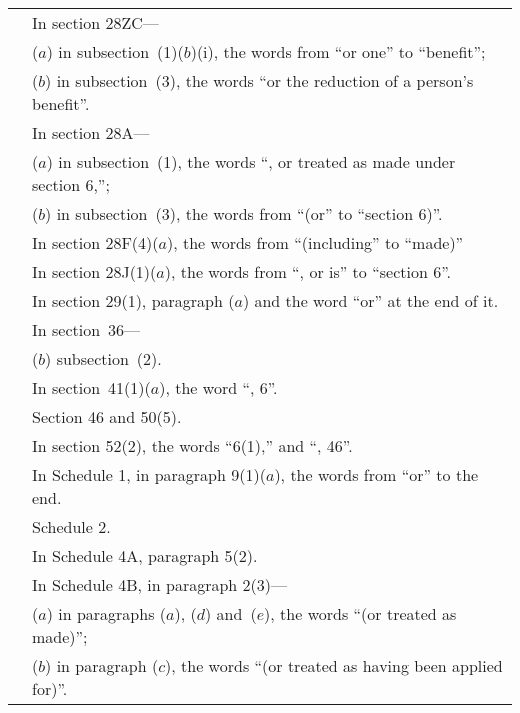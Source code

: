 \documentclass[12pt,a4paper]{article}
\begin{document}
\begin{longtable}{p{137.53691pt}p{228.4536pt}}
&In section 28ZC—\\
&\hspace*{1em}($a$) in subsection~(1)($b$)(i), the words from “or \hspace*{1em}one” to “benefit”;\\
&\hspace*{1em}($b$) in subsection~(3), the words “or the reduc\-\hspace*{1em}tion of a person's benefit”. \\
&In section 28A—\\
&\hspace*{1em}($a$)
in subsection~(1), the words “, or treated \hspace*{1em}as made under section 6,”;\\
&\hspace*{1em}($b$)
in subsection~(3), the words from “(or” to \hspace*{1em}“section 6)”. \\
&In section 28F(4)($a$), the words from “(including” to “made)”\\
&In section 28J(1)($a$), the words from “, or is” to “section 6”. \\
&In section 29(1), paragraph ($a$) and the word “or” at the end of it. \\
&In section~36—\\
&\hspace*{1em}($b$) subsection~(2). \\
&In section~41(1)($a$), the word “, 6”. \\
&Section 46 and 50(5).\\
&In section 52(2), the words “6(1),” and “, 46”. \\
\opt{2012rules}{
&In Schedule 1, in paragraph 9(1)($a$), the words from “or” to the end.\\
}
&Schedule 2.\\
&In Schedule 4A, paragraph 5(2).\\
&In Schedule 4B, in paragraph 2(3)—\\
&\hspace*{1em}($a$)
in paragraphs ($a$), ($d$) and~($e$), the words \hspace*{1em}“(or treated as made)”;\\
&\hspace*{1em}($b$)
in paragraph ($c$), the words “(or treated as \hspace*{1em}having been applied for)”. \\

\end{longtable}
\end{document}
